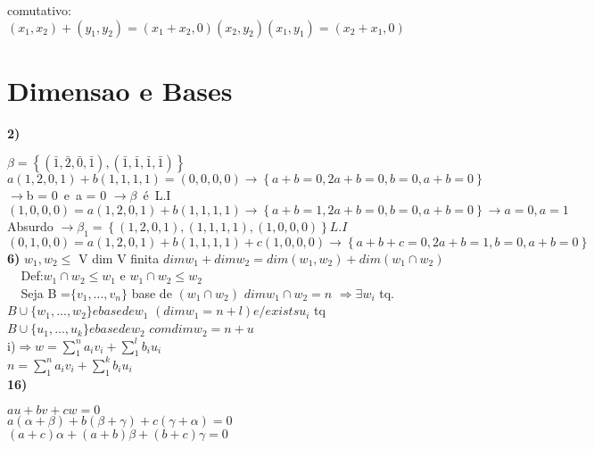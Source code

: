 \documentclass[a4paper,12pt]{report}
\begin{document}
comutativo: $(x_{1},x_{2}) + (y_{1},y_{2}) = (x_{1}+x_{2},0) (x_{2},y_{2})(x_{1},y_{1}) = (x_{2} +x_{1},0)$\\

\section{Dimensao e Bases}
\textbf{2)}

$\beta = \left \{ (\bar{1},\bar{2},\bar{0},\bar{1}) , (\bar{1},\bar{1},\bar{1},\bar{1}) \right \}$\\

$a(1,2,0,1) + b(1,1,1,1) = (0,0,0,0) \rightarrow \left \{ a+b = 0, 2a+b = 0, b = 0, a+b = 0 \right \}$ $\rightarrow $b = 0\ e\ a = 0 
$\rightarrow \beta$\  \'e\  L.I \\

$(1,0,0,0) = a(1,2,0,1) + b(1,1,1,1) \rightarrow\left \{a+b = 1, 2a+b =  0, b=0, a+b = 0 \right \} \rightarrow a=0, a=1\ $ Absurdo
$\rightarrow \beta_1 = \left \{ (1,2,0,1),(1,1,1,1),(1,0,0,0) \right \} L.I$\\

$(0,1,0,0) = a(1,2,0,1) + b(1,1,1,1) + c(1,0,0,0) \rightarrow \left \{ a+b+c = 0, 2a+b = 1, b = 0, a+b = 0 \right \}$ \\


\textbf{6)}
$w_1, w_2 \leq$ V dim V finita
$dim w_1 + dim w_2 = dim (w_1, w_2) + dim (w_1 \cap w_2)$ \\
$~~~~~$Def:$ w_1 \cap w_2 \leq w_1 $ e $ w_1 \cap w_2 \leq w_2$ \\ 
$~~~~~$Seja B =$\lbrace v_1, ... , v_n \rbrace$ base de $(w_1 \cap w_2)$  $dim w_1 \cap w_2 = n$
$\Longrightarrow \exists w_i$ tq.$ B \cup \lbrace w_1, ... , w_2\rbrace e base de w_1$
$(dim  w_1 = n+ l) e /exists u_i$ tq $ B \cup \lbrace u_1, ... , u_k\rbrace e base de w_2$
$com dim w_2 = n + u$ \\

i)$\Longrightarrow  w = \sum_{1}^{n} a_i v_i + \sum_{1}^{l} b_i u_i$ \\
$ n = \sum_{1}^{n} a_i v_i + \sum_{1}^{k} b_i u_i$ \\

\textbf{16)}

$au+bv+cw = 0$\\

$a(\alpha+\beta) + b(\beta+\gamma) + c(\gamma+\alpha) = 0$\\

$(a+c)\alpha + (a+b)\beta + (b+c)\gamma = 0 $\\
\end{document}
